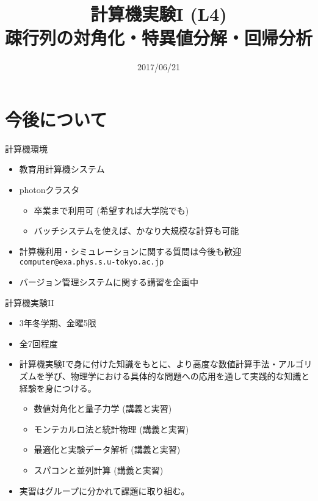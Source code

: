\documentclass[dvipdfmx]{beamer}
\title{計算機実験I (L4) \\ 疎行列の対角化・特異値分解・回帰分析}
\date{2017/06/21}
\begin{document}
\begin{frame}
  \titlepage
  \tableofcontents
\end{frame}





\section{今後について}

\begin{frame}[t,fragile]{計算機環境}
  \begin{itemize}
    \setlength{\itemsep}{1em}
  \item 教育用計算機システム
  \item photonクラスタ
    \begin{itemize}
    \item 卒業まで利用可 (希望すれば大学院でも)
    \item バッチシステムを使えば、かなり大規模な計算も可能
    \end{itemize}
  \item 計算機利用・シミュレーションに関する質問は今後も歓迎 {\tt computer@exa.phys.s.u-tokyo.ac.jp}
  \item バージョン管理システムに関する講習を企画中
  \end{itemize}
\end{frame}

\begin{frame}[t,fragile]{計算機実験II}
  \begin{itemize}
    \setlength{\itemsep}{1em}
  \item 3年冬学期、金曜5限
  \item 全7回程度
  \item 計算機実験Iで身に付けた知識をもとに、より高度な数値計算手法・アルゴリズムを学び、物理学における具体的な問題への応用を通して実践的な知識と経験を身につける。
    \begin{itemize}
      \item 数値対角化と量子力学 (講義と実習)
      \item モンテカルロ法と統計物理 (講義と実習)
      \item 最適化と実験データ解析 (講義と実習)
      \item スパコンと並列計算 (講義と実習)
    \end{itemize}
    \item 実習はグループに分かれて課題に取り組む。
  \end{itemize}
\end{frame}
\end{document}
